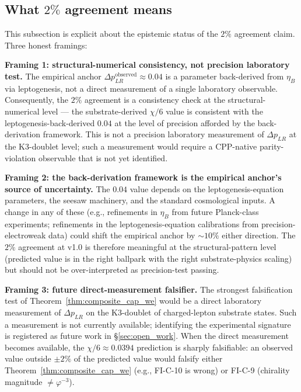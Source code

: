 \documentclass[11pt,letterpaper]{article}
\newcommand{\phig}{\varphi}
\newcommand{\DeltapLR}{\Delta p_{LR}}
\begin{document}
\subsection{What $2\%$ agreement means}\label{sec:dplr_what_2_percent_means}

This subsection is explicit about the epistemic status of the $2\%$ agreement claim. Three honest framings:

\textbf{Framing 1: structural-numerical consistency, not precision laboratory test.} The empirical anchor $\DeltapLR^{\text{observed}} \approx 0.04$ is a parameter back-derived from $\eta_B$ via leptogenesis, not a direct measurement of a single laboratory observable. Consequently, the $2\%$ agreement is a consistency check at the structural-numerical level --- the substrate-derived $\chi/6$ value is consistent with the leptogenesis-back-derived $0.04$ at the level of precision afforded by the back-derivation framework. This is not a precision laboratory measurement of $\DeltapLR$ at the K3-doublet level; such a measurement would require a CPP-native parity-violation observable that is not yet identified.

\textbf{Framing 2: the back-derivation framework is the empirical anchor's source of uncertainty.} The $0.04$ value depends on the leptogenesis-equation parameters, the seesaw machinery, and the standard cosmological inputs. A change in any of these (e.g., refinements in $\eta_B$ from future Planck-class experiments; refinements in the leptogenesis-equation calibrations from precision-electroweak data) could shift the empirical anchor by $\sim 10\%$ either direction. The $2\%$ agreement at v1.0 is therefore meaningful at the structural-pattern level (predicted value is in the right ballpark with the right substrate-physics scaling) but should not be over-interpreted as precision-test passing.

\textbf{Framing 3: future direct-measurement falsifier.} The strongest falsification test of Theorem~\ref{thm:composite_cap_we} would be a direct laboratory measurement of $\DeltapLR$ on the K3-doublet of charged-lepton substrate states. Such a measurement is not currently available; identifying the experimental signature is registered as future work in \S\ref{sec:open_work}. When the direct measurement becomes available, the $\chi/6 \approx 0.0394$ prediction is sharply falsifiable: an observed value outside $\pm 2\%$ of the predicted value would falsify either Theorem~\ref{thm:composite_cap_we} (e.g., FI-C-10 is wrong) or FI-C-9 (chirality magnitude $\neq \phig^{-3}$).
\end{document}

